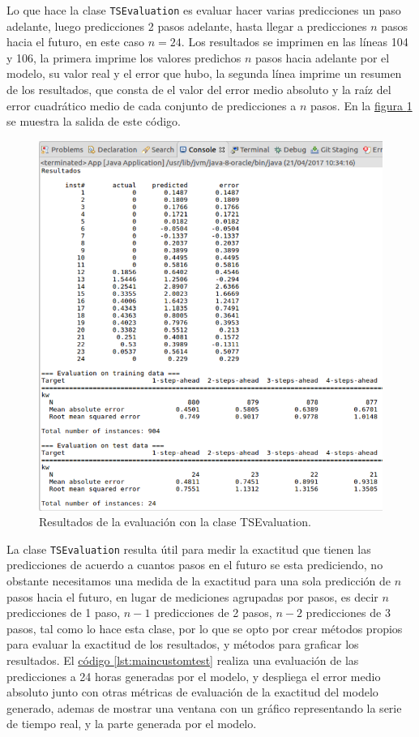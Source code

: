 Lo que hace la clase \texttt{TSEvaluation} es evaluar hacer varias predicciones un paso adelante, luego predicciones 2 pasos adelante, hasta llegar a predicciones $n$ pasos hacia el futuro, en este caso $n=24$.
Los resultados se imprimen en las líneas 104 y 106, la primera imprime los valores predichos $n$ pasos hacia adelante por el modelo, su valor real y el error que hubo, la segunda línea imprime un resumen de los resultados, que consta de el valor del error medio absoluto y la raíz del error cuadrático medio de cada conjunto de predicciones a $n$ pasos. En la  \hyperref[fig:resultadosEvaluacion]{figura \ref{fig:resultadosEvaluacion}} se muestra la salida de este código. 

\begin{figure}[!h]
	\centering
	\includegraphics[width=15cm]{img/resultadosEvaluacion.png}
	\caption{Resultados de la evaluación con la clase TSEvaluation. }
	\label{fig:resultadosEvaluacion}
\end{figure}
La clase \texttt{TSEvaluation} resulta útil para medir la exactitud que tienen las predicciones de acuerdo a cuantos pasos en el futuro se esta prediciendo, no obstante necesitamos una medida de la exactitud para una sola predicción de $n$ pasos hacia el futuro, en lugar de mediciones agrupadas por pasos, es decir $n$ predicciones de 1 paso, $n-1$ predicciones de 2 pasos, $n-2$ predicciones de 3 pasos, tal como lo hace esta clase, por lo que se opto por crear métodos propios para evaluar la exactitud de los resultados, y métodos para graficar los resultados.
El \hyperref[lst:maincustomtest]{código \ref{lst:maincustomtest}} realiza una evaluación de las predicciones a 24 horas generadas por el modelo, y despliega el error medio absoluto junto con otras métricas de evaluación de la exactitud del modelo generado, ademas de mostrar una ventana con un gráfico representando la serie de tiempo real, y la parte generada por el modelo.

